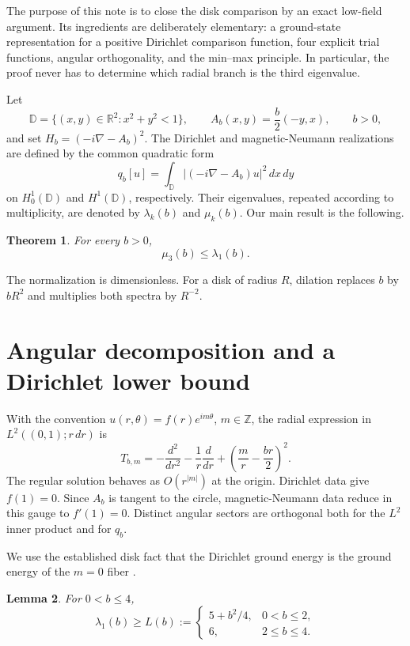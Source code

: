 \documentclass[11pt]{article}
\newtheorem{theorem}{Theorem}[section]
\newtheorem{lemma}[theorem]{Lemma}
\newcommand{\D}{\mathbb D}
\newcommand{\R}{\mathbb R}
\newcommand{\qb}{q_b}
\begin{document}
The purpose of this note is to close the disk comparison by an exact
low-field argument.  Its ingredients are deliberately elementary: a
ground-state representation for a positive Dirichlet comparison function,
four explicit trial functions, angular orthogonality, and the min--max
principle.  In particular, the proof never has to determine which radial
branch is the third eigenvalue.

Let
\[
  \D=\{(x,y)\in\R^2:x^2+y^2<1\},\qquad
  A_b(x,y)=\frac b2(-y,x),\qquad b>0,
\]
and set $H_b=(-i\nabla-A_b)^2$.  The Dirichlet and magnetic-Neumann
realizations are defined by the common quadratic form
\[
  \qb[u]=\int_{\D}|(-i\nabla-A_b)u|^2\,dx\,dy
\]
on $H_0^1(\D)$ and $H^1(\D)$, respectively.  Their eigenvalues, repeated
according to multiplicity, are denoted by $\lambda_k(b)$ and $\mu_k(b)$.
Our main result is the following.

\begin{theorem}\label{thm:main}
For every $b>0$,
\[
  \mu_3(b)\leq\lambda_1(b).
\]
\end{theorem}

The normalization is dimensionless.  For a disk of radius $R$, dilation
replaces $b$ by $bR^2$ and multiplies both spectra by $R^{-2}$.

\section{Angular decomposition and a Dirichlet lower bound}

With the convention $u(r,\theta)=f(r)e^{im\theta}$, $m\in\mathbb Z$, the
radial expression in $L^2((0,1);r\,dr)$ is
\begin{equation}\label{eq:fiber}
  T_{b,m}=-\frac{d^2}{dr^2}-\frac1r\frac d{dr}
           +\left(\frac mr-\frac{br}{2}\right)^2.
\end{equation}
The regular solution behaves as $O(r^{|m|})$ at the origin.  Dirichlet data
give $f(1)=0$.  Since $A_b$ is tangent to the circle, magnetic-Neumann data
reduce in this gauge to $f'(1)=0$.  Distinct angular sectors are orthogonal
both for the $L^2$ inner product and for $\qb$.

We use the established disk fact that the Dirichlet ground energy is the
ground energy of the $m=0$ fiber \cite[Sec.~5]{Lotoreichik2025}.

\begin{lemma}\label{lem:dirichlet}
For $0<b\leq4$,
\begin{equation}\label{eq:L}
  \lambda_1(b)\geq L(b):=
  \begin{cases}
    5+b^2/4,&0<b\leq2,\\
    6,&2\leq b\leq4.
  \end{cases}
\end{equation}
\end{lemma}
\end{document}
